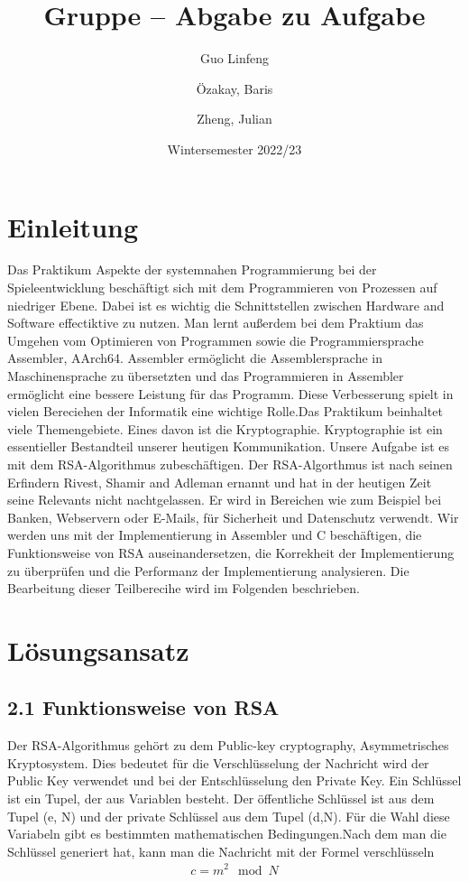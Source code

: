 \documentclass[course=asp]{aspdoc}
\author{Guo Linfeng \and Özakay, Baris \and Zheng, Julian}
\date{Wintersemester 2022/23} %
\title{Gruppe \theGroup{} -- Abgabe zu Aufgabe \theNumber}
\begin{document}
\maketitle

\section{Einleitung}
Das Praktikum Aspekte der systemnahen Programmierung bei der Spieleentwicklung beschäftigt sich mit dem Programmieren von Prozessen auf niedriger Ebene. Dabei ist es wichtig die Schnittstellen zwischen Hardware and Software effectiktive zu nutzen. Man lernt außerdem bei dem Praktium das Umgehen vom Optimieren von Programmen sowie die Programmiersprache Assembler, AArch64. Assembler ermöglicht die Assemblersprache in Maschinensprache zu übersetzten und das Programmieren in Assembler ermöglicht eine bessere Leistung für das Programm. Diese Verbesserung spielt in vielen Bereciehen der Informatik eine wichtige Rolle.\newline Das Praktikum beinhaltet viele Themengebiete. Eines davon ist die Kryptographie. Kryptographie ist ein essentieller Bestandteil unserer heutigen Kommunikation. Unsere Aufgabe ist es mit dem RSA-Algorithmus zubeschäftigen. Der RSA-Algorthmus ist nach seinen Erfindern Rivest, Shamir and Adleman ernannt und hat in der heutigen Zeit seine Relevants nicht nachtgelassen. Er wird in Bereichen wie zum Beispiel bei Banken, Webservern oder E-Mails, für Sicherheit und Datenschutz verwendt. Wir werden uns mit der Implementierung in Assembler und C beschäftigen, die Funktionsweise von RSA auseinandersetzen, die Korrekheit der Implementierung zu überprüfen und die Performanz der Implementierung analysieren. Die Bearbeitung dieser Teilberecihe wird im Folgenden beschrieben.

\section{Lösungsansatz}
\subsection*{2.1 Funktionsweise von RSA }
Der RSA-Algorithmus gehört zu dem Public-key cryptography, Asymmetrisches Kryptosystem. Dies bedeutet für die Verschlüsselung der Nachricht wird der Public Key verwendet und bei der Entschlüsselung den Private Key. Ein Schlüssel ist ein Tupel, der aus Variablen besteht. Der öffentliche Schlüssel ist aus dem Tupel (e, N) und der private Schlüssel aus dem Tupel (d,N). Für die Wahl diese Variabeln gibt es bestimmten mathematischen Bedingungen.\newline Nach dem man die Schlüssel generiert hat, kann man die Nachricht mit der Formel verschlüsseln
\begin{align}
    c  {=}   m^2 \mod N
\end{align} 
\end{document}
